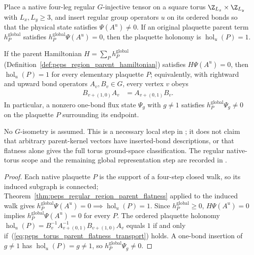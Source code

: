 \begin{lemma}%
    \label{thm:peps_regular_torus_parent_flatness}
    \leanok
    Place a native four-leg regular $G$-injective tensor on a square torus
    $\Z_{L_x}\times\Z_{L_y}$ with $L_x,L_y\ge 3$, and insert regular group
    operators $u$ on its ordered bonds so that the physical state satisfies
    $\Psi(A^u)\ne 0$. If an original plaquette parent term $h_P^{\mathrm{global}}$
    satisfies $h_P^{\mathrm{global}}\Psi(A^u)=0$, then the plaquette holonomy
    is $\operatorname{hol}_u(P)=1$.

    If the parent Hamiltonian $H=\sum_P h_P^{\mathrm{global}}$
    (Definition~\ref{def:peps_region_parent_hamiltonian}) satisfies
    $H\Psi(A^u)=0$, then $\operatorname{hol}_u(P)=1$ for every elementary
    plaquette $P$; equivalently, with rightward and upward bond operators
    $A_v,B_v\in G$, every vertex $v$ obeys
    \begin{align}
        B_{v+(1,0)}A_v & = A_{v+(0,1)}B_v.
        \label{eq:peps_torus_parent_flatness_transport}
    \end{align}
    In particular, a nonzero one-bond flux state $\Psi_g$ with $g\ne 1$
    satisfies $h_P^{\mathrm{global}}\Psi_g\ne 0$ on the plaquette $P$
    surrounding its endpoint.

    No $G$-isometry is assumed. This is a necessary local step in
    \cite[Theorem~5.5]{Schuch2010PEPS}; it does not claim that
    arbitrary parent-kernel vectors have inserted-bond descriptions,
    or that flatness alone gives the full torus ground-space classification.
    The regular native-torus scope and the remaining global representation step are recorded in
    \cite{gap:rmp_peps_quantum_double_g_isometry}.
\end{lemma}

\begin{proof}\leanok
    Each native plaquette $P$ is the support of a four-step closed walk,
    so its induced subgraph is connected; Theorem~\ref{thm:peps_regular_region_parent_flatness}
    applied to the induced walk gives $h_P^{\mathrm{global}}\Psi(A^u)=0\implies\operatorname{hol}_u(P)=1$.
    Since $h_P^{\mathrm{global}}\ge 0$, $H\Psi(A^u)=0$ implies
    $h_P^{\mathrm{global}}\Psi(A^u)=0$ for every $P$.
    The ordered plaquette holonomy
    $\operatorname{hol}_u(P)=B_v^{-1}A_{v+(0,1)}^{-1}B_{v+(1,0)}A_v$ equals
    $1$ if and only if~(\ref{eq:peps_torus_parent_flatness_transport}) holds.
    A one-bond insertion of $g\ne 1$ has $\operatorname{hol}_u(P)=g\ne 1$,
    so $h_P^{\mathrm{global}}\Psi_g\ne 0$.
\end{proof}
